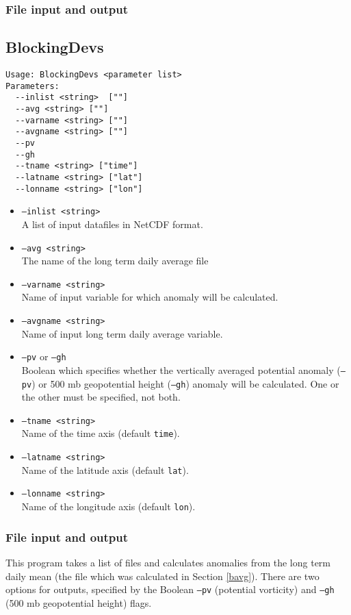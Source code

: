 \documentclass{article}
\begin{document}
\subsubsection{File input and output}



\subsection{BlockingDevs}\label{dev}
\begin{verbatim}
Usage: BlockingDevs <parameter list>
Parameters:
  --inlist <string>  [""]
  --avg <string> [""]
  --varname <string> [""]
  --avgname <string> [""]
  --pv
  --gh
  --tname <string> ["time"]
  --latname <string> ["lat"]
  --lonname <string> ["lon"]
\end{verbatim}

\begin{itemize}
\item[]\texttt{--inlist <string>} \\ A list of input datafiles in NetCDF format. 
\item[] \texttt{--avg <string>}\\ The name of the long term daily average file 
\item[] \texttt{--varname <string>}\\Name of input variable for which anomaly will be calculated.
\item[]\texttt{--avgname <string>}\\Name of input long term daily average variable.
\item[]\texttt{--pv} or \texttt{--gh}\\Boolean which specifies whether the vertically averaged potential anomaly (\texttt{--pv}) or 500 mb geopotential height (\texttt{--gh}) anomaly will be calculated. One or the other must be specified, not both.
\item[] \texttt{--tname <string>}\\Name of the time axis (default \texttt{time}).
\item[]\texttt{--latname <string>}\\Name of the latitude axis (default \texttt{lat}).
\item[]\texttt{--lonname <string>}\\Name of the longitude axis (default \texttt{lon}).
\end{itemize}

\subsubsection{File input and output}
This program takes a list of files and calculates anomalies from the long term daily mean (the file which was calculated in Section \ref{bavg}). There are two options for outputs, specified by the Boolean \texttt{--pv} (potential vorticity) and \texttt{--gh} (500 mb geopotential height) flags. 
\end{document}
